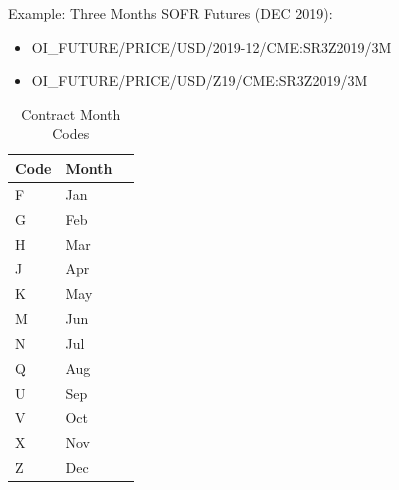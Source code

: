 \medskip
Example: Three Months SOFR Futures (DEC 2019):
\begin{itemize}
\item {OI\_FUTURE/PRICE/USD/2019-12/CME:SR3Z2019/3M}
\item {OI\_FUTURE/PRICE/USD/Z19/CME:SR3Z2019/3M}
\end{itemize}


\begin{table}[H]
\centering
  \begin{tabular}{|p{3cm}|p{4.5cm}|p{7cm}|}
  \hline
    {\bf Code} & {\bf Month} \\ \hline
    F & Jan \\
    G & Feb \\
    H & Mar \\
    J & Apr \\
    K & May \\
    M & Jun \\
    N & Jul \\
    Q & Aug \\
    U & Sep \\
    V & Oct \\
    X & Nov \\
    Z & Dec \\ \hline
  \end{tabular}
  \caption{Contract Month Codes}
  \label{tab:contract_month_codes}
\end{table}

